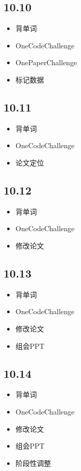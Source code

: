 \documentclass[UTF8]{ctexart}
\begin{document}
\subsection*{10.10}
\begin{itemize}
    \item 背单词
    \item OneCodeChallenge
    \item OnePaperChallenge
    \item 标记数据
\end{itemize}

\subsection*{10.11}
\begin{itemize}
    \item 背单词
    \item OneCodeChallenge
    \item 论文定位
\end{itemize}

\subsection*{10.12}
\begin{itemize}
    \item 背单词
    \item OneCodeChallenge
    \item 修改论文
\end{itemize}

\subsection*{10.13}
\begin{itemize}
    \item 背单词
    \item OneCodeChallenge
    \item 修改论文
    \item 组会PPT
\end{itemize}

\subsection*{10.14}
\begin{itemize}
    \item 背单词
    \item OneCodeChallenge
    \item 修改论文
    \item 组会PPT
    \item 阶段性调整
\end{itemize}
\end{document}
